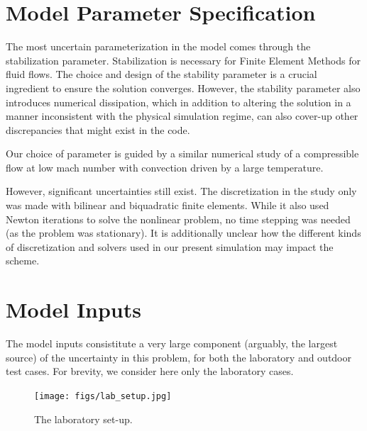\documentclass{article}
\begin{document}




%
% 
%
%
\section{Model Parameter Specification}

The most uncertain parameterization in the model comes through the
stabilization parameter. Stabilization is necessary for Finite Element
Methods for fluid flows\cite{franca1992stabilized}. The choice and
design of the stability parameter is a crucial ingredient to ensure the
solution converges. However, the stability parameter also introduces
numerical dissipation, which in addition to altering the solution in a
manner inconsistent with the physical simulation regime, can also
cover-up other discrepancies that might exist in the code. 

Our choice of parameter is guided by a similar numerical
study\cite{Becker2002428} of a compressible flow at low mach number with
convection driven by a large temperature. 

However, significant uncertainties still exist. The discretization in
the study only was made with bilinear and biquadratic finite elements. 
While it also used Newton iterations to solve the nonlinear problem, no
time stepping was needed (as the problem was stationary). It is
additionally unclear how the different kinds of discretization and
solvers used in our present simulation may impact the scheme.

%
%
%
\section{Model Inputs}

The model inputs consistitute a very large component (arguably, the
largest source) of the uncertainty in this problem, for both the
laboratory and outdoor test cases. For brevity, we consider here only
the laboratory cases. 

  \begin{figure}[!htb]
    \begin{center}
     \texttt{[image: figs/lab\_setup.jpg]}
     \caption{The laboratory set-up.}
     \label{lab}
    \end{center}
  \end{figure}
\end{document}
